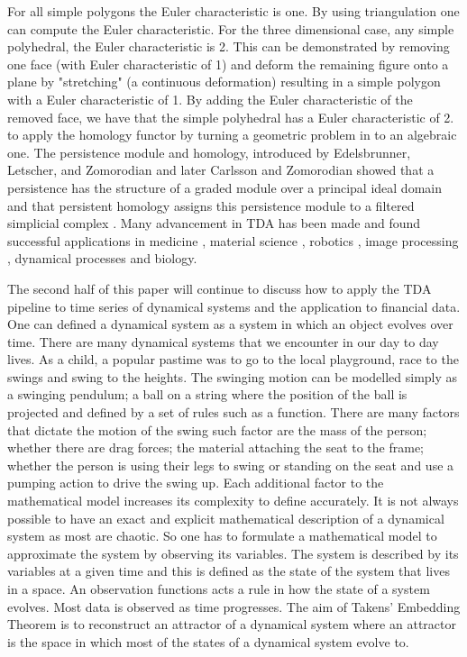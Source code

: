 \documentclass{article}
\begin{document}
For all simple polygons the Euler characteristic is one. By using triangulation one can compute the Euler characteristic. For the three dimensional case, any simple polyhedral, the Euler characteristic is 2. This can be demonstrated by removing one face (with Euler characteristic of 1) and deform the remaining figure onto a plane by "stretching" (a continuous deformation) resulting in a simple polygon with a Euler characteristic of 1. By adding the Euler characteristic of the removed face, we have that the simple polyhedral has a Euler characteristic of 2.
to apply the homology functor by turning a geometric problem in to an algebraic one. The persistence module and homology, introduced by Edelsbrunner, Letscher, and Zomorodian \cite{EdelTopPersist} and later Carlsson and Zomorodian \cite{AZComputePH} showed that a persistence has the structure of a graded module over a principal ideal domain and that persistent homology assigns this persistence module to a filtered simplicial complex \cite{HSchenckAlgebraicFound}. Many advancement in TDA has been made and found successful applications in medicine \cite{DEWOSKIN2010157}, material science \cite{https://doi.org/10.1002/jcc.23816}, robotics \cite{TOPTrajeFlorian}, image processing \cite{CSurfaceDataChung}, dynamical processes \cite{Maleti__2016} and biology\cite{CarlssonTDAappli}.

The second half of this paper will continue to discuss how to apply the TDA pipeline to time series of dynamical systems and the application to financial data. One can defined a dynamical system as a system in which an object evolves over time. There are many dynamical systems that we encounter in our day to day lives. As a child, a popular pastime was to go to the local playground, race to the swings and swing to the heights. The swinging motion can be modelled simply as a swinging pendulum; a ball on a string where the position of the ball is projected and defined by a set of rules such as a function. There are many factors that dictate the motion of the swing such factor are the mass of the person; whether there are drag forces; the material attaching the seat to the frame; whether the person is using their legs to swing or standing on the seat and use a pumping action to drive the swing up. Each additional factor to the mathematical model increases its complexity to define accurately. It is not always possible to have an exact and explicit mathematical description of a dynamical system as most are chaotic. So one has to formulate a mathematical model to approximate the system by observing its variables. The system is described by its variables at a given time and this is defined as the state of the system that lives in a space. An observation functions acts a rule in how the state of a system evolves. Most data is observed as time progresses.   The aim of Takens' Embedding Theorem is to reconstruct an attractor of a dynamical system where an attractor is the space in which most of the states of a dynamical system evolve to.
\end{document}
